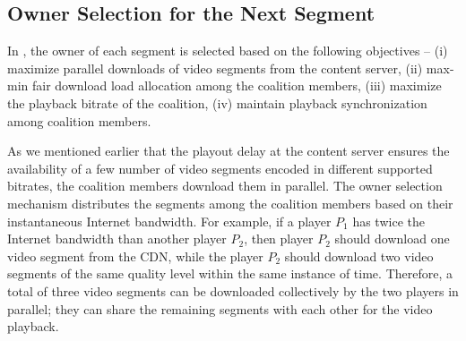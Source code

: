 %
%
%
\subsection{Owner Selection for the Next Segment\label{sec:nextLeadSelect}} In {\our}, the owner of each segment is selected based on the following objectives -- (i) maximize parallel downloads of video segments from the content server, (ii) max-min fair download load allocation among the coalition members, (iii) maximize the playback bitrate of the coalition, (iv) maintain playback synchronization among coalition members. 

As we mentioned earlier that the playout delay at the content server ensures the availability of a few number of video segments encoded in different supported bitrates, the coalition members download them in parallel. The owner selection mechanism distributes the segments among the coalition members based on their instantaneous Internet bandwidth. For example, if a player $P_1$ has twice the Internet bandwidth than another player $P_2$, then player $P_2$ should download one video segment from the \ac{CDN}, while the player $P_2$ should download two video segments of the same quality level within the same instance of time. Therefore, a total of three video segments can be downloaded collectively by the two players in parallel; they can share the remaining segments with each other for the video playback.    

